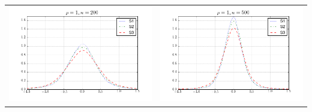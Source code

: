 \begin{table}[!ht]
{\begin{tabular}{c c}
\includegraphics[width=8cm]{alpha_density_200_1} & \includegraphics[width=8cm]{alpha_density_500_1} \\
\end{tabular}
}
\end{table}

